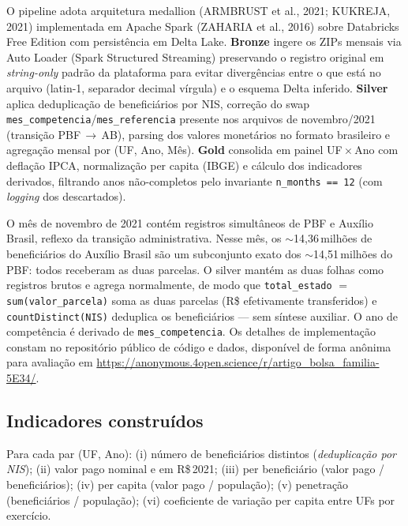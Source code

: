 \documentclass[12pt,a4paper,oneside]{article}
\newcommand{\rs}{R\$\,}
\begin{document}
O pipeline adota arquitetura medallion (ARMBRUST et al., 2021; KUKREJA, 2021) implementada em Apache
Spark (ZAHARIA et al., 2016) sobre Databricks Free Edition com
persistência em Delta Lake.
\textbf{Bronze} ingere os ZIPs mensais via Auto Loader (Spark
Structured Streaming) preservando o registro original em
\textit{string-only} \textemdash{} padrão da plataforma para evitar
divergências entre o que está no arquivo (latin-1, separador
decimal vírgula) e o esquema Delta inferido.
\textbf{Silver} aplica deduplicação de beneficiários por NIS,
correção do swap \texttt{mes\_competencia}/\texttt{mes\_referencia}
presente nos arquivos de novembro/2021 (transição PBF\,$\to$\,AB),
parsing dos valores monetários no formato brasileiro e agregação
mensal por (UF, Ano, Mês).
\textbf{Gold} consolida em painel UF\,$\times$\,Ano com deflação
IPCA, normalização per capita (IBGE) e cálculo dos indicadores
derivados, filtrando anos não-completos pelo invariante
\texttt{n\_months == 12} (com \textit{logging} dos descartados).

\begin{tcolorbox}[
  colback=blue!2,colframe=blue!60!black,
  boxrule=0.6pt,arc=2pt,
  left=8pt,right=8pt,top=4pt,bottom=4pt,
  title={\small\textbf{Nota metodológica — tratamento da transição PBF\,$\to$\,AB em novembro de 2021}},
  fonttitle=\small\bfseries,
  ]\small
O mês de novembro de 2021 contém registros simultâneos de PBF e
Auxílio Brasil, reflexo da transição administrativa. Nesse mês,
os $\sim$14,36\,milhões de beneficiários do Auxílio Brasil são um
subconjunto exato dos $\sim$14,51\,milhões do PBF: todos receberam as
duas parcelas. O silver mantém as duas folhas como registros brutos e
agrega normalmente, de modo que \texttt{total\_estado} $=$
\texttt{sum(valor\_parcela)} soma as duas parcelas (R\$ efetivamente
transferidos) e \texttt{countDistinct(NIS)} deduplica os beneficiários
— sem síntese auxiliar. O ano de competência é derivado de
\texttt{mes\_competencia}. Os detalhes de implementação constam no
repositório público de código e dados, disponível de forma anônima para
avaliação em \url{https://anonymous.4open.science/r/artigo_bolsa_familia-5E34/}.
\end{tcolorbox}

\subsection{Indicadores construídos}

Para cada par (UF, Ano): (i) número de beneficiários distintos
(\textit{deduplicação por NIS});
(ii) valor pago nominal e em \rs 2021;
(iii) per beneficiário (valor pago / beneficiários);
(iv) per capita (valor pago / população);
(v) penetração (beneficiários / população);
(vi) coeficiente de variação per capita entre UFs por exercício.
\end{document}
